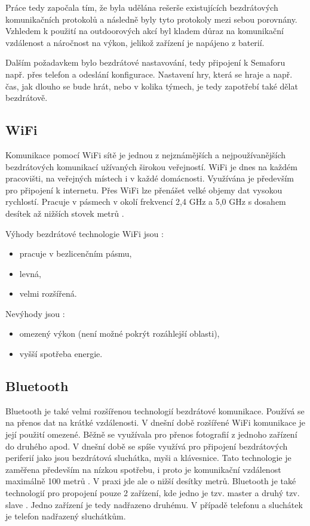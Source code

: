 Práce tedy započala tím, že byla udělána rešerše existujících bezdrátových komunikačních protokolů a následně byly tyto protokoly 
mezi sebou porovnány. Vzhledem k použití na outdoorových akcí byl kladem důraz na komunikační vzdálenost a náročnost na výkon, 
jelikož zařízení je napájeno z baterií. 

Dalším požadavkem bylo bezdrátové nastavování, tedy připojení k Semaforu např. přes telefon a odeslání konfigurace. Nastavení hry,
která se hraje a např. čas, jak dlouho se bude hrát, nebo v kolika týmech, je tedy zapotřebí také dělat bezdrátově. 

\subsection{WiFi}
Komunikace pomocí WiFi sítě je jednou z nejznámějších a nejpoužívanějších bezdrátových komunikací užívaných širokou veřejností. 
WiFi je dnes na každém pracovišti, na veřejných místech i v každé domácnosti. Využívána je především pro připojení k internetu. 
Přes WiFi lze přenášet velké objemy dat vysokou rychlostí. Pracuje v pásmech v okolí frekvencí 2,4 GHz a 5,0 GHz s dosahem 
desítek až nižších stovek metrů \cite{Bezdrat_muni}. 

Výhody bezdrátové technologie WiFi jsou \cite{Bezdrat_muni}:
\begin{itemize}
  \item pracuje v bezlicenčním pásmu, 
  \item levná, 
  \item velmi rozšířená.
\end{itemize}

Nevýhody jsou \cite{Bezdrat_muni}:
\begin{itemize}
  \item omezený výkon (není možné pokrýt rozáhlejší oblasti), 
  \item vyšší spotřeba energie.
\end{itemize}

\subsection{Bluetooth}
Bluetooth je také velmi rozšířenou technologií bezdrátové komunikace. Používá se na přenos dat na krátké vzdálenosti. V dnešní době 
rozšířené WiFi komunikace je její použití omezené. Běžně se využívala pro přenos fotografií z jednoho zařízení do druhého apod. V dnešní 
době se spíše využívá pro připojení bezdrátových periferií jako jsou bezdrátová sluchátka, myši a klávesnice. Tato technologie je zaměřena 
především na nízkou spotřebu, i proto je komunikační vzdálenost maximálně 100 metrů \cite{Bezdrat_muni}. V praxi jde ale o nižší desítky
metrů. Bluetooth je také technologií pro propojení pouze 2 zařízení, kde jedno je tzv. master a druhý tzv. slave \cite{Bezdrat_muni}. 
Jedno zařízení je tedy nadřazeno druhému. V případě telefonu a sluchátek je telefon nadřazený sluchátkům. 

